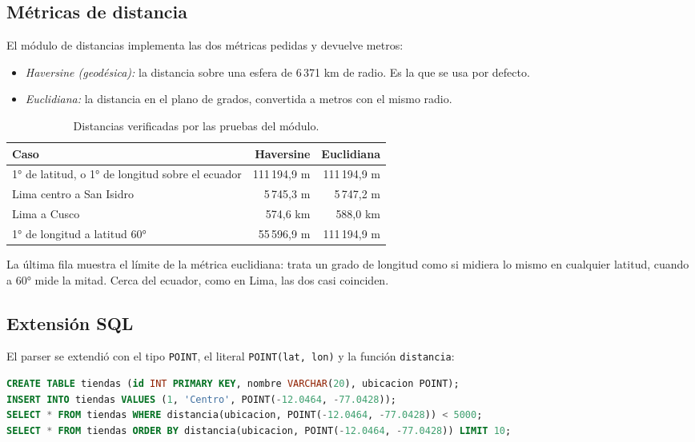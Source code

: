 \documentclass[11pt,a4paper]{article}
\begin{document}
\subsection{Métricas de distancia}

El módulo de distancias implementa las dos métricas pedidas y devuelve metros:

\begin{itemize}
  \item \emph{Haversine (geodésica):} la distancia sobre una esfera de 6\,371 km de radio. Es la que se usa por defecto.
  \item \emph{Euclidiana:} la distancia en el plano de grados, convertida a metros con el mismo radio.
\end{itemize}

\begin{table}[H]
\centering
\begin{tabular}{lrr}
\toprule
Caso & Haversine & Euclidiana \\
\midrule
1° de latitud, o 1° de longitud sobre el ecuador & 111\,194,9 m & 111\,194,9 m \\
Lima centro a San Isidro & 5\,745,3 m & 5\,747,2 m \\
Lima a Cusco & 574,6 km & 588,0 km \\
1° de longitud a latitud 60° & 55\,596,9 m & 111\,194,9 m \\
\bottomrule
\end{tabular}
\caption{Distancias verificadas por las pruebas del módulo.}
\end{table}

La última fila muestra el límite de la métrica euclidiana: trata un grado de longitud como si midiera lo mismo en cualquier latitud, cuando a 60° mide la mitad. Cerca del ecuador, como en Lima, las dos casi coinciden.

\subsection{Extensión SQL}

El parser se extendió con el tipo \texttt{POINT}, el literal \texttt{POINT(lat, lon)} y la función \texttt{distancia}:

\begin{lstlisting}[language=SQL]
CREATE TABLE tiendas (id INT PRIMARY KEY, nombre VARCHAR(20), ubicacion POINT);
INSERT INTO tiendas VALUES (1, 'Centro', POINT(-12.0464, -77.0428));
SELECT * FROM tiendas WHERE distancia(ubicacion, POINT(-12.0464, -77.0428)) < 5000;
SELECT * FROM tiendas ORDER BY distancia(ubicacion, POINT(-12.0464, -77.0428)) LIMIT 10;
\end{lstlisting}
\end{document}
